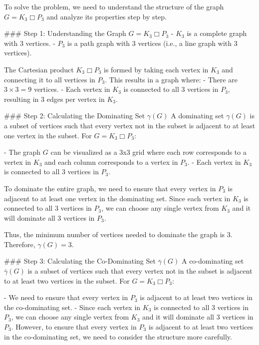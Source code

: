 To solve the problem, we need to understand the structure of the graph \( G = K_3 \Box P_3 \) and analyze its properties step by step.

### Step 1: Understanding the Graph \( G = K_3 \Box P_3 \)
- \( K_3 \) is a complete graph with 3 vertices.
- \( P_3 \) is a path graph with 3 vertices (i.e., a line graph with 3 vertices).

The Cartesian product \( K_3 \Box P_3 \) is formed by taking each vertex in \( K_3 \) and connecting it to all vertices in \( P_3 \). This results in a graph where:
- There are \( 3 \times 3 = 9 \) vertices.
- Each vertex in \( K_3 \) is connected to all 3 vertices in \( P_3 \), resulting in 3 edges per vertex in \( K_3 \).

### Step 2: Calculating the Dominating Set \(\gamma(G)\)
A dominating set \(\gamma(G)\) is a subset of vertices such that every vertex not in the subset is adjacent to at least one vertex in the subset. For \( G = K_3 \Box P_3 \):

- The graph \( G \) can be visualized as a 3x3 grid where each row corresponds to a vertex in \( K_3 \) and each column corresponds to a vertex in \( P_3 \).
- Each vertex in \( K_3 \) is connected to all 3 vertices in \( P_3 \).

To dominate the entire graph, we need to ensure that every vertex in \( P_3 \) is adjacent to at least one vertex in the dominating set. Since each vertex in \( K_3 \) is connected to all 3 vertices in \( P_3 \), we can choose any single vertex from \( K_3 \) and it will dominate all 3 vertices in \( P_3 \).

Thus, the minimum number of vertices needed to dominate the graph is 3. Therefore, \(\gamma(G) = 3\).

### Step 3: Calculating the Co-Dominating Set \(\overline{\gamma}(G)\)
A co-dominating set \(\overline{\gamma}(G)\) is a subset of vertices such that every vertex not in the subset is adjacent to at least two vertices in the subset. For \( G = K_3 \Box P_3 \):

- We need to ensure that every vertex in \( P_3 \) is adjacent to at least two vertices in the co-dominating set.
- Since each vertex in \( K_3 \) is connected to all 3 vertices in \( P_3 \), we can choose any single vertex from \( K_3 \) and it will dominate all 3 vertices in \( P_3 \). However, to ensure that every vertex in \( P_3 \) is adjacent to at least two vertices in the co-dominating set, we need to consider the structure more carefully.

